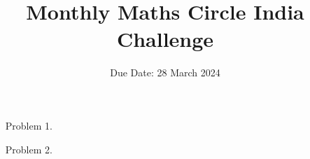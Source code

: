 \documentclass[a4paper,12pt]{article}
\title{Monthly Maths Circle India Challenge}
\date{Due Date: 28 March 2024}
\begin{document}
\maketitle
\thispagestyle{empty}
\begin{enumerate}
    \item[Problem 1.] 
    \item[Problem 2.] 
\end{enumerate}
\end{document}
